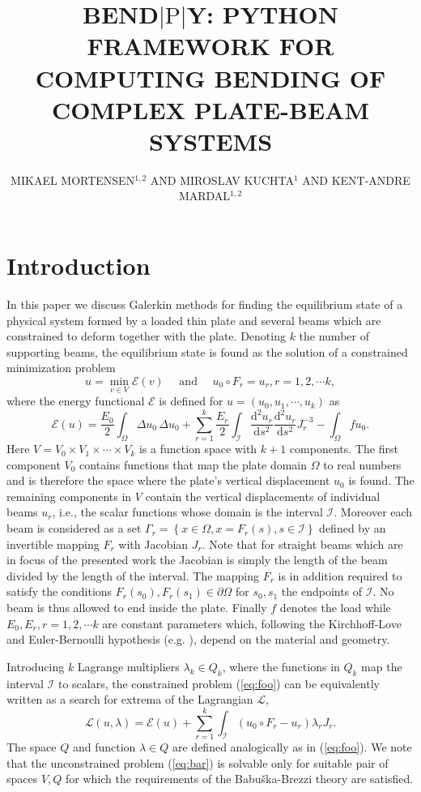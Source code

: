 \documentclass{marine_2015}
\title{
  BEND$\left|\text{P}\right|$Y: PYTHON FRAMEWORK FOR COMPUTING BENDING OF COMPLEX PLATE-BEAM SYSTEMS
}
\author{MIKAEL MORTENSEN$^{1, 2}$ AND MIROSLAV KUCHTA$^{1}$ AND KENT-ANDRE MARDAL$^{1, 2}$ }
\newcommand{\deriv}[2]{\ensuremath{\frac{\mathrm{d}#1}{\mathrm{d}#2}}}
\begin{document}
\section{Introduction}
In this paper we discuss Galerkin methods for finding the equilibrium state of a 
physical system formed by a loaded thin plate and several beams which are constrained 
to deform together with the plate. Denoting $k$ the number of supporting beams, 
the equilibrium state is found as the solution of a constrained minimization problem
\begin{equation}
  \label{eq:foo}
  u = \min_{v\in V} \mathcal{E}\left(v\right)\quad\text{ and }\quad u_0\circ F_r
  = u_r, r=1, 2, \cdots k,
\end{equation}
where the energy functional $\mathcal{E}$ is defined for $u=\left(u_0, u_1,
\cdots, u_k\right)$ as
\[
  \mathcal{E}\left(u\right)=
    \frac{E_0}{2}\displaystyle\int_{\Omega}\Delta u_0\,\Delta u_0+
    \sum_{r=1}^k\frac{E_r}{2}\int_{\mathcal{I}}
  \deriv{^2u_r}{s^2}\deriv{^2u_r}{s^2}J_r^{-3}
  -\displaystyle\int_{\Omega}f u_0.
\]
Here $V=V_0\times V_1 \times\cdots\times V_k$ is a function space with $k+1$
components. The first component $V_0$ contains functions that map the plate
domain $\Omega$ to real numbers and is therefore the space where the plate's
vertical displacement $u_0$ is found. The remaining components in $V$ contain the 
vertical displacements of individual beams $u_r$, i.e., the scalar 
functions whose domain is the interval $\mathcal{I}$. Moreover each beam is
considered as a set $\Gamma_r=\left\{x\in\Omega, x=F_r\left(s\right), s\in\mathcal{I}\right\}$
defined by an invertible mapping $F_r$ with Jacobian $J_r$. Note that for straight 
beams which are in focus of the presented work the Jacobian is simply the length of
the beam divided by the length of the interval. The mapping $F_r$ is in addition 
required to satisfy the conditions $F_r\left(s_0\right), F_r\left(s_1\right)\in\partial\Omega$ 
for $s_0, s_1$ the endpoints of $\mathcal{I}$. No beam is thus allowed to end inside 
the plate. Finally $f$ denotes the load while $E_0, E_r, r=1,2,\cdots k$ are 
constant parameters which, following the Kirchhoff-Love and Euler-Bernoulli
hypothesis (e.g. \cite{reddy}), depend on the material and geometry.

Introducing $k$ Lagrange multipliers $\lambda_k\in Q_k$, where the functions in 
$Q_k$ map the interval $\mathcal{I}$ to scalars, the constrained problem 
(\ref{eq:foo}) can be equivalently written as a search for extrema of the Lagrangian
$\mathcal{L}$,
\begin{equation}
  \label{eq:bar}
\mathcal{L}\left(u, \lambda\right) = \mathcal{E}\left(u\right) +
  \sum_{r=1}^k\int_{\mathcal{I}}\left(u_0\circ F_r - u_r\right)\lambda_r J_r.
\end{equation}
The space $Q$ and function $\lambda\in Q$ are defined analogically as in (\ref{eq:foo}).
We note that the unconstrained problem (\ref{eq:bar}) is solvable only for
suitable pair of spaces $V, Q$ for which the requirements of the
Babu\v{s}ka-Brezzi\cite{babuska, brezzi} theory are satisfied.
\end{document}
